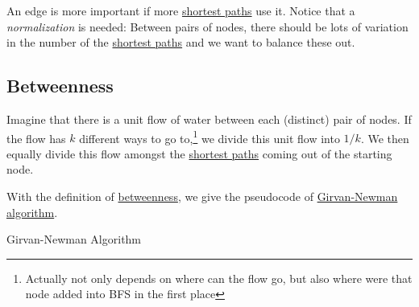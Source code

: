 \begin{intuition}
	An edge is more important if more \hyperref[def:shortest-path]{shortest paths} use it. Notice that a \emph{normalization} is needed:
	Between pairs of nodes, there should be lots of variation in the number of the \hyperref[def:shortest-path]{shortest paths} and we want to balance these out.
\end{intuition}

\subsection{Betweenness}
\begin{definition}[Betweenness]\label{def:betweenness}
	Imagine that there is a unit flow of water between each (distinct) pair of nodes. If the flow has \(k\) different ways to go to,\footnote{Actually not only depends on where can the flow go, but also where were that node added into BFS in the first place}
	we divide this unit flow into \(1/k\). We then equally divide this flow amongst the \hyperref[def:shortest-path]{shortest paths} coming out of the starting node.
\end{definition}

With the definition of \hyperref[def:betweenness]{betweenness}, we give the pseudocode of \hyperref[algo:Girvan-Newman-algorithm]{Girvan-Newman algorithm}.

\par
\begin{algorithm}[H]\label{algo:Girvan-Newman-algorithm}
	\DontPrintSemicolon
	\caption{Girvan-Newman Algorithm}
	\BlankLine

	\;
	\Return{}\;
\end{algorithm}

